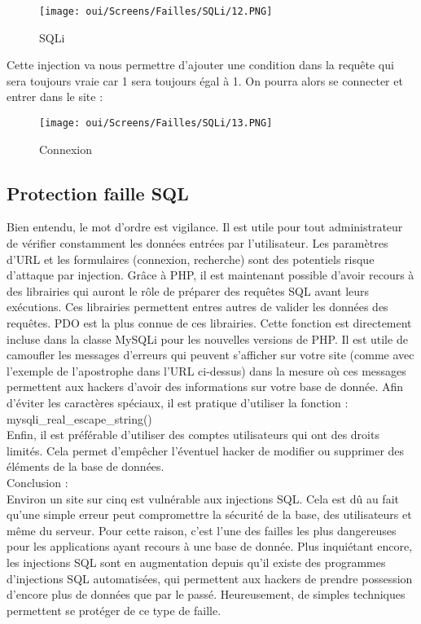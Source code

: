 \begin{figure}[htp!]
  \centering
  \setlength\figureheight{7cm}
  \setlength\figurewidth{9cm}
  \texttt{[image: oui/Screens/Failles/SQLi/12.PNG]}
  \caption{SQLi}
  \label{fig:courbe-tikz}
\end{figure}

Cette injection va nous permettre d’ajouter une condition dans la requête qui sera toujours vraie car 1 sera toujours égal à 1. On pourra alors se connecter et entrer dans le site  :

\begin{figure}[htp!]
  \centering
  \setlength\figureheight{7cm}
  \setlength\figurewidth{9cm}
  \texttt{[image: oui/Screens/Failles/SQLi/13.PNG]}
  \caption{Connexion}
  \label{fig:courbe-tikz}
\end{figure}

\subsection{Protection faille SQL}

Bien entendu, le mot d’ordre est vigilance. Il est utile pour tout administrateur de vérifier constamment les données entrées par l’utilisateur. Les paramètres d’URL et les formulaires (connexion, recherche) sont des potentiels risque d’attaque par injection.
Grâce à PHP, il est maintenant possible d’avoir recours à des librairies qui auront le rôle de préparer des requêtes SQL avant leurs exécutions. Ces librairies permettent entres autres de valider les données des requêtes.
PDO est la plus connue de ces librairies. Cette fonction est directement incluse dans la classe MySQLi pour les nouvelles versions de PHP.
Il est utile de camoufler les messages d’erreurs qui peuvent s’afficher sur votre site (comme avec l’exemple de l’apostrophe dans l’URL ci-dessus) dans la mesure où ces messages permettent aux hackers d’avoir des informations sur votre base de donnée. 
Afin d’éviter les caractères spéciaux, il est pratique d’utiliser la fonction :\\ mysqli\_real\_escape\_string()\\
Enfin, il est préférable d’utiliser des comptes utilisateurs qui ont des droits limités. Cela permet d’empêcher l'éventuel hacker de modifier ou supprimer des éléments de la base de données.\\

Conclusion :\\

Environ un site sur cinq est vulnérable aux injections SQL. Cela est dû au fait qu’une simple erreur peut compromettre la sécurité de la base, des utilisateurs et même du serveur. Pour cette raison, c’est l’une des failles les plus dangereuses pour les applications ayant recours à une base de donnée. Plus inquiétant encore, les injections SQL sont en augmentation depuis qu'il existe des programmes d'injections SQL automatisées, qui permettent aux hackers de prendre possession d’encore plus de données que par le passé. Heureusement, de simples techniques permettent se protéger de ce type de faille.



